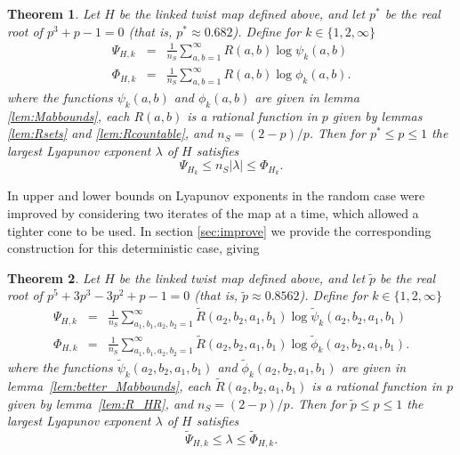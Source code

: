 \documentclass{iopart}
\newtheorem{theorem}{Theorem}
\begin{document}
\begin{theorem}\label{thm:simple_bounds}
Let $H$ be the linked twist map defined above, and let $p^*$ be the real root of $p^3+p-1=0$ (that is, $p^* \approx 0.682$). Define for $k \in \{ 1,2, \infty\}$
\begin{eqnarray}
\Psi_{H,k} &=& \frac{1}{n_S} \sum_{a,b = 1}^\infty R(a,b) \log \psi_k (a,b)\\
\Phi_{H,k} &=& \frac{1}{n_S} \sum_{a,b = 1}^\infty R(a,b) \log \phi_k (a,b).
\end{eqnarray}
where the functions $\psi_k (a,b)$ and $\phi_k (a,b)$ are given in lemma \ref{lem:Mabbounds}, each $R(a,b)$ is a rational function in $p$ given by lemmas \ref{lem:Rsets} and \ref{lem:Rcountable}, and $n_S = (2-p)/p$.  Then for $p^* \le p \le 1$ the largest Lyapunov exponent $\lambda$ of $H$ satisfies
\begin{equation}\label{eq:le_bounds}
\Psi_{H_k}  \le n_S |\lambda| \le \Phi_{H_k}.
\end{equation}
  

\end{theorem}

In \cite{sturman2019lyapunov} upper and lower bounds on Lyapunov exponents in the random case were improved by considering two iterates of the map at a time, which allowed a tighter cone to be used. In section \ref{sec:improve} we provide the corresponding construction for this deterministic case, giving
\begin{theorem}\label{thm:better_bounds}
Let $H$ be the linked twist map defined above, and let $\tilde{p}$ be the real root of $p^5+3p^3-3p^2+p-1=0$ (that is, $\tilde{p} \approx 0.8562$). Define for $k \in \{ 1,2, \infty\}$
\begin{eqnarray}
\Psi_{H,k} &=& \frac{1}{n_S} \sum_{a_1,b_1,a_2,b_2 = 1}^\infty \tilde{R}(a_2,b_2,a_1,b_1) \log \tilde{\psi}_k (a_2,b_2,a_1,b_1)\\
\Phi_{H,k} &=& \frac{1}{n_S} \sum_{a_1,b_1,a_2,b_2 = 1}^\infty \tilde{R}(a_2,b_2,a_1,b_1) \log \tilde{\phi}_k (a_2,b_2,a_1,b_1).
\end{eqnarray}
where the functions $\tilde{\psi}_k (a_2,b_2,a_1,b_1) $ and $\tilde{\phi}_k (a_2,b_2,a_1,b_1)$ are given in lemma~\ref{lem:better_Mabbounds}, each $\tilde{R}(a_2,b_2,a_1,b_1)$ is a 
rational function in $p$ given by lemma~\ref{lem:R_HR}, and $n_S = (2-p)/p$.  Then for $\tilde{p} \le p \le 1$ the largest Lyapunov exponent $\lambda$ of $H$ satisfies
\begin{equation}\label{eq:le_bounds_improved}
\tilde{\Psi}_{H,k}  \le \lambda \le \tilde{\Phi}_{H,k}.
\end{equation}
\end{theorem}
\end{document}
